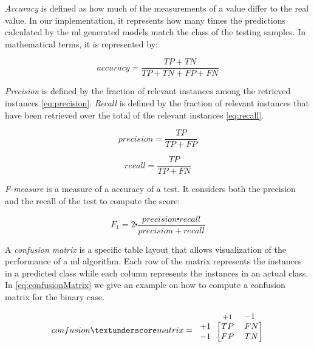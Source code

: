 \textit{Accuracy} is defined as how much of the measurements of a value differ to the real value. In our implementation, it represents how many times the predictions calculated by the \ac{ml} generated models match the class of the testing samples. In mathematical terms, it is represented by:

\begin{equation}
\label{eq:accuracy}
accuracy=\frac{TP + TN} {TP + TN + FP + FN} 
\end{equation}


\textit{Precision} is defined by the fraction of relevant instances among the retrieved instances \ref{eq:precision}. \textit{Recall} is defined by the fraction of relevant instances that have been retrieved over the total of the relevant instances \ref{eq:recall}.


\begin{equation}
\label{eq:precision}
precision=\frac{TP}{TP + FP}
\end{equation}

\begin{equation}
\label{eq:recall}
recall=\frac{TP}{TP + FN}
\end{equation}

\textit{F-measure} is a measure of a accuracy of a test. It considers both the precision and the recall of the test to compute the score:

\begin{equation}
\label{eq:f-measure}
F_1=2\centerdot \frac{precision\centerdot recall}{precision + recall}
\end{equation}


A \textit{confusion matrix} is a specific table layout that allows visualization of the performance of a \ac{ml} algorithm. Each row of the matrix represents the instances in a predicted class while each column represents the instances in an actual class. In \ref{eq:confusionMatrix} we give an example on how to compute a confusion matrix for the binary case.

\begin{equation*}
\label{eq:confusionMatrix}
  confusion\textunderscore matrix=
  \begin{blockarray}{*{2}{c} l}
    \begin{block}{*{2}{>{$\footnotesize}c<{$}} l}
      &+1 & -1  \\
    \end{block}
    \begin{block}{c [*{2}{c}]}
      +1 & TP & FN  \\
      -1 & FP & TN \\
    \end{block}
  \end{blockarray}
\end{equation*}


